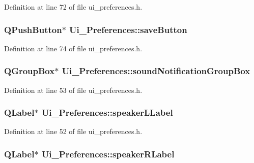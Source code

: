 Definition at line 72 of file ui\_\-preferences.h.

\hypertarget{classUi__Preferences_ae4ec3c79a28a3832734f67045576804e}{
\subsubsection[{saveButton}]{\setlength{\rightskip}{0pt plus 5cm}QPushButton$\ast$ {\bf Ui\_\-Preferences::saveButton}}}
\label{classUi__Preferences_ae4ec3c79a28a3832734f67045576804e}


Definition at line 74 of file ui\_\-preferences.h.

\hypertarget{classUi__Preferences_a643214d4acc744082f2ab12e9920c42b}{
\subsubsection[{soundNotificationGroupBox}]{\setlength{\rightskip}{0pt plus 5cm}QGroupBox$\ast$ {\bf Ui\_\-Preferences::soundNotificationGroupBox}}}
\label{classUi__Preferences_a643214d4acc744082f2ab12e9920c42b}


Definition at line 53 of file ui\_\-preferences.h.

\hypertarget{classUi__Preferences_a1178f394ee8cfda62146d337d7f24b43}{
\subsubsection[{speakerLLabel}]{\setlength{\rightskip}{0pt plus 5cm}QLabel$\ast$ {\bf Ui\_\-Preferences::speakerLLabel}}}
\label{classUi__Preferences_a1178f394ee8cfda62146d337d7f24b43}


Definition at line 52 of file ui\_\-preferences.h.

\hypertarget{classUi__Preferences_aef659dd6026acb1ed7afaabdcdcf55b0}{
\subsubsection[{speakerRLabel}]{\setlength{\rightskip}{0pt plus 5cm}QLabel$\ast$ {\bf Ui\_\-Preferences::speakerRLabel}}}
\label{classUi__Preferences_aef659dd6026acb1ed7afaabdcdcf55b0}


